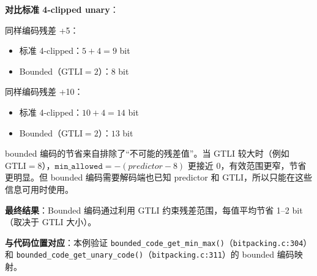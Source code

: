 \begin{examplebox}[title={例 2c：Bounded 编码示例}]
\textbf{对比标准 4-clipped unary}：

同样编码残差 +5：
\begin{itemize}
  \item 标准 4-clipped：$5 + 4 = 9$ bit
  \item Bounded（$\mathrm{GTLI}=2$）：$8$ bit
\end{itemize}

同样编码残差 +10：
\begin{itemize}
  \item 标准 4-clipped：$10 + 4 = 14$ bit
  \item Bounded（$\mathrm{GTLI}=2$）：$13$ bit
\end{itemize}

\begin{engineeringnote}
bounded 编码的节省来自排除了``不可能的残差值''。当 GTLI 较大时（例如 $\mathrm{GTLI}=8$），$\texttt{min\_allowed} = -(\mathit{predictor} - 8)$ 更接近 0，有效范围更窄，节省更明显。但 bounded 编码需要解码端也已知 predictor 和 GTLI，所以只能在这些信息可用时使用。
\end{engineeringnote}

\medskip
\textbf{最终结果}：Bounded 编码通过利用 GTLI 约束残差范围，每值平均节省 1--2 bit（取决于 GTLI 大小）。

\medskip
\textbf{与代码位置对应}：本例验证 \texttt{bounded\_code\_get\_min\_max()}（\texttt{bitpacking.c:304}）和 \texttt{bounded\_code\_get\_unary\_code()}（\texttt{bitpacking.c:311}）的 bounded 编码映射。
\end{examplebox}

